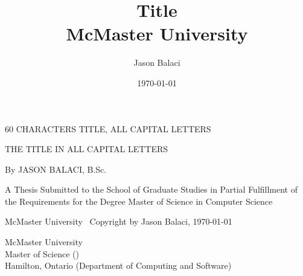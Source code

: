 \documentclass[12pt,oneside]{book}
\title{
    {Title}\\
    {McMaster University}
}
\author{Jason Balaci}
\date{\today}
\begin{document}
\frontmatter

\setlength{\marginparwidth}{3.8cm}
\reversemarginpar %
\todototoc
\listoftodos
\newpage



\null %
\vspace{0.25\textheight}

\begin{center}
  60 CHARACTERS TITLE, ALL CAPITAL LETTERS
\end{center}

\newpage


\null
\vspace{0.2\textheight}

\begin{center}
  THE TITLE IN ALL CAPITAL LETTERS

  \vspace{2cm}

  By JASON BALACI, B.Sc.

  \vfill

  A Thesis Submitted to the School of Graduate Studies in Partial Fulfillment of the Requirements for the Degree Master of Science in Computer Science

  \vspace{2cm}

  McMaster University \textcopyright\ Copyright by Jason Balaci, \today

\end{center}

\newpage


\setcounter{page}{2} %

\noindent
McMaster University \\
Master of Science (\the\year{}) \\
Hamilton, Ontario (Department of Computing and Software)
\end{document}

